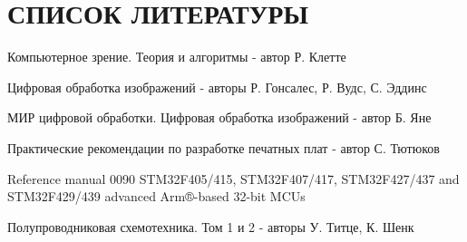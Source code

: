 \chapter*{СПИСОК ЛИТЕРАТУРЫ}


\begin{myitems}
	\item Компьютерное зрение. Теория и алгоритмы - автор Р. Клетте
	\item Цифровая обработка изображений - авторы Р. Гонсалес, Р. Вудс, С. Эддинс
	\item МИР цифровой обработки. Цифровая обработка изображений - автор Б. Яне
	\item Практические рекомендации по разработке печатных плат - автор С. Тютюков
	\item Reference manual 0090 STM32F405/415, STM32F407/417, STM32F427/437 and STM32F429/439 advanced Arm®-based 32-bit MCUs
	\item Полупроводниковая схемотехника. Том 1 и 2 - авторы У. Титце, К. Шенк
\end{myitems}
